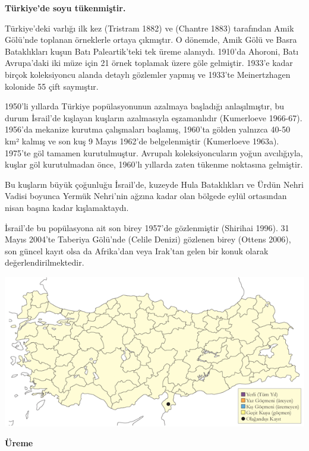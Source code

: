 \documentclass[
  letterpaper,
  DIV=11,
  numbers=noendperiod]{scrreprt}
\begin{document}
\textbf{Türkiye'de soyu tükenmiştir.}

Türkiye'deki varlığı ilk kez (Tristram 1882) ve (Chantre 1883)
tarafından Amik Gölü'nde toplanan örneklerle ortaya çıkmıştır. O
dönemde, Amik Gölü ve Basra Bataklıkları kuşun Batı Paleartik'teki tek
üreme alanıydı. 1910'da Ahoroni, Batı Avrupa'daki iki müze için 21 örnek
toplamak üzere göle gelmiştir. 1933'e kadar birçok koleksiyoncu alanda
detaylı gözlemler yapmış ve 1933'te Meinertzhagen kolonide 55 çift
saymıştır.

1950'li yıllarda Türkiye popülasyonunun azalmaya başladığı
anlaşılmıştır, bu durum İsrail'de kışlayan kuşların azalmasıyla
eşzamanlıdır (Kumerloeve 1966-67). 1956'da mekanize kurutma çalışmaları
başlamış, 1960'ta gölden yalnızca 40-50 km² kalmış ve son kuş 9 Mayıs
1962'de belgelenmiştir (Kumerloeve 1963a). 1975'te göl tamamen
kurutulmuştur. Avrupalı koleksiyoncuların yoğun avcılığıyla, kuşlar göl
kurutulmadan önce, 1960'lı yıllarda zaten tükenme noktasına gelmiştir.

Bu kuşların büyük çoğunluğu İsrail'de, kuzeyde Hula Bataklıkları ve
Ürdün Nehri Vadisi boyunca Yermük Nehri'nin ağzına kadar olan bölgede
eylül ortasından nisan başına kadar kışlamaktaydı.

İsrail'de bu popülasyona ait son birey 1957'de gözlenmiştir (Shirihai
1996). 31 Mayıs 2004'te Taberiya Gölü'nde (Celile Denizi) gözlenen birey
(Ottens 2006), son güncel kayıt olsa da Afrika'dan veya Irak'tan gelen
bir konuk olarak değerlendirilmektedir.

\includegraphics{images/harita_Page_080.png}

\textbf{Üreme}
\end{document}
